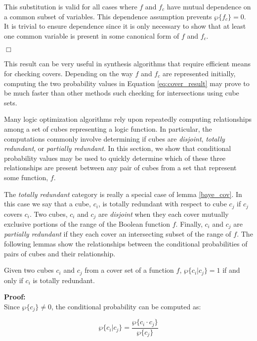This substitution is valid for all cases where $f$ and $f_c$ have mutual dependence
on a common subset of variables.  This dependence assumption prevents $\wp \{ f_c \} =0$.
It is trivial to ensure dependence since it is only necessary to show that at least
one common variable is present in some canonical form of $f$ and $f_c$.

\hfill $\Box$

This result can be very useful in synthesis algorithms that require
efficient means for checking covers.  Depending on the way $f$ and $f_c$
are represented initially, computing the two probability
values in Equation \ref{eq:cover_result} may prove to be much faster
than other methods such checking for intersections using cube sets.

Many logic optimization algorithms rely upon repeatedly computing relationships
among a set of cubes representing a logic function.  In particular, the computations
commonly involve determining if cubes are {\em disjoint}, {\em totally redundant},
or {\em partially redundant}.  In this section, we show that conditional probability
values may be used to quickly determine which of these three relationships are present
between any pair of cubes from a set that represent some function, $f$.

The {\em totally redundant} category is really a special case of lemma \ref{baye_cov}.
In this case we say that a cube, $c_i$, is totally redundant with respect to cube $c_j$
if $c_j$ covers $c_i$.  Two cubes, $c_i$ and $c_j$ are {\em disjoint} when they each cover
mutually exclusive portions of the range of the Boolean function $f$.
Finally, $c_i$ and $c_j$ are {\em partially redundant} if they each cover an intersecting 
subset of the range of $f$.  The following lemmas show the relationships between the
conditional probabilities of pairs of cubes and their relationship.

\begin{lemma}   \label{tot_redun}
Given two cubes $c_i$ and $c_j$ from a cover set of a function $f$,
$\wp \{ c_i | c_j \} = 1$ if and only if $c_i$ is totally redundant.
\end{lemma}

\noindent
{\bf Proof:} \\
Since $\wp \{ c_j \} \neq 0$, the conditional probability can be computed 
as:

\begin{equation}
\wp \{ c_i | c_j \} = \frac{ \wp \{ c_i \cdot c_j \} }{ \wp \{ c_j \}} \label{eq:cub_baye}
\end{equation}

